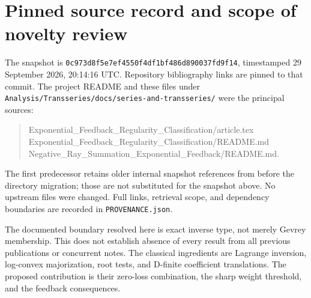 \documentclass[11pt,a4paper]{article}
\numberwithin{equation}{section}
\theoremstyle{definition}
\theoremstyle{remark}
\newcommand{\commit}{\nolinkurl{0c973d8f5e7ef4550f4df1bf486d890037fd9f14}}
\begin{document}
\section{Pinned source record and scope of novelty review}
\label{app:sources}

The snapshot is \commit, timestamped 29 September 2026,
20:14:16 UTC. Repository bibliography links are pinned to that commit.
The project README and these files under
\texttt{Analysis/Transseries/docs/series-and-transseries/} were the
principal sources:
\begin{quote}\small\ttfamily
Exponential\_Feedback\_Regularity\_Classification/article.tex\\
Exponential\_Feedback\_Regularity\_Classification/README.md\\
Negative\_Ray\_Summation\_Exponential\_Feedback/README.md.
\end{quote}
The first predecessor retains older internal snapshot references from
before the directory migration; those are not substituted for the
snapshot above. No upstream files were changed. Full links, retrieval
scope, and dependency boundaries are recorded in \texttt{PROVENANCE.json}.

The documented boundary resolved here is exact inverse type, not merely
Gevrey membership. This does not establish absence of every result from
all previous publications or concurrent notes. The classical ingredients
are Lagrange inversion, log-convex majorization, root tests, and D-finite
coefficient translations. The proposed contribution is their zero-loss
combination, the sharp weight threshold, and the feedback consequences.
\end{document}
